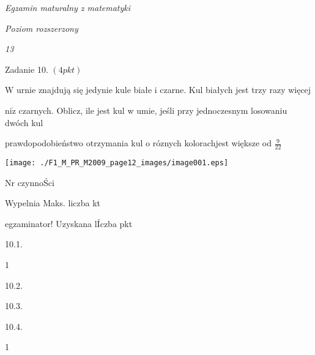 \documentclass[a4paper,12pt]{article}
\begin{document}
{\it Egzamin maturalny z matematyki}

{\it Poziom rozszerzony}

{\it 13}

Zadanie 10. $(4pkt)$

$\mathrm{W}$ urnie znajdują się jedynie kule białe i czarne. Kul białych jest trzy razy więcej

$\mathrm{n}\mathrm{i}\dot{\mathrm{z}}$ czarnych. Oblicz, ile jest kul w umie, jeśli przy jednoczesnym losowaniu dwóch kul

prawdopodobieństwo otrzymania kul o róznych kolorachjest większe od $\displaystyle \frac{9}{22}$
\begin{center}
\texttt{[image: ./F1\_M\_PR\_M2009\_page12\_images/image001.eps]}
\end{center}
Nr czynnoŚci

Wypelnia Maks. liczba kt

egzaminator! Uzyskana lÍczba pkt

10.1.

1

10.2.

10.3.

10.4.

1
\end{document}
